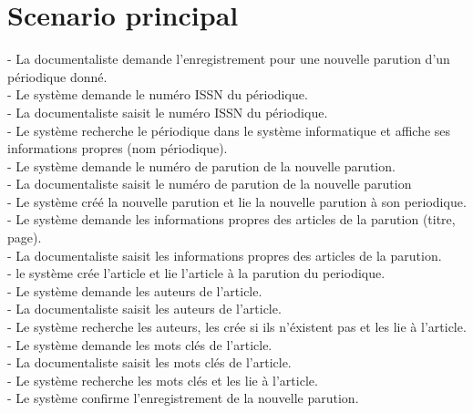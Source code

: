 \documentclass[a4paper,10pt]{report}
\begin{document}
\bigskip

\section*{Scenario principal}
\begin{flushleft}
- La documentaliste demande l'enregistrement pour une nouvelle parution d'un périodique donné.\\
- Le système demande le numéro ISSN du périodique.\\
- La documentaliste saisit le numéro ISSN du périodique.\\
- Le système recherche le périodique dans le système informatique et affiche ses informations propres (nom périodique).\\
- Le système demande le numéro de parution de la nouvelle parution.\\
- La documentaliste saisit le numéro de parution de la nouvelle parution\\
- Le système créé la nouvelle parution et lie la nouvelle parution à son periodique.\\
- Le système demande les informations propres des articles de la parution (titre, page).\\
- La documentaliste saisit les informations propres des articles de la parution.\\
- le système crée l'article et lie l'article à la parution du periodique.\\
- Le système demande les auteurs de l'article.\\
- La documentaliste saisit les auteurs de l'article.\\
- Le système recherche les auteurs, les crée si ils n'éxistent pas et les lie à l'article.\\
- Le système demande les mots clés de l'article.\\
- La documentaliste saisit les mots clés de l'article.\\
- Le système recherche les mots clés et les lie à l'article.\\
- Le système confirme l'enregistrement de la nouvelle parution.\\
\end{flushleft}

\bigskip
\end{document}
